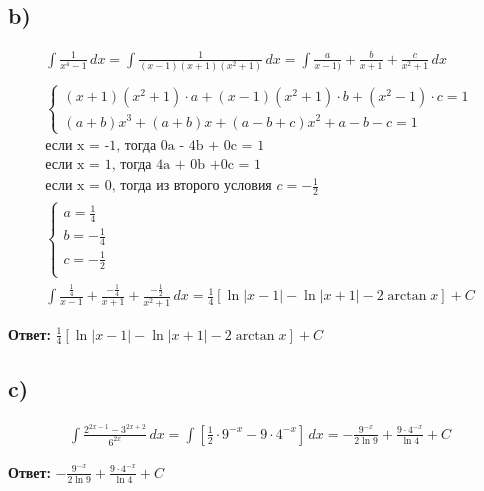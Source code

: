 \documentclass[a4paper,12pt]{article}
\begin{document}
\subsection*{b)}
\begin{equation*}
\begin{gathered}
\int \frac{1}{x^4-1} \,dx = \int \frac{1}{(x-1)(x+1)(x^2+1)} \,dx = \int \frac{a}{x-1)} + \frac{b}{x+1} + \frac{c}{x^2+1} \,dx \\
\\      
\begin{cases}
(x+1)(x^2+1) \cdot a + (x-1)(x^2+1) \cdot b + (x^2-1) \cdot c =  1 \\
(a+b)x^3 + (a+b)x + (a-b+c)x^2 + a  - b - c = 1
\end{cases} \\
\text{если x = -1, тогда 0a - 4b + 0c = 1} \\
\text{если x = 1, тогда 4a  + 0b  +0c = 1} \\
\text{если x = 0, тогда из второго условия } c =-\frac{1}{2}\\
\begin{cases}
a = \frac{1}{4} \\
b = -\frac{1}{4} \\
c = -\frac{1}{2} \\
\end{cases} \\
\int \frac{\frac{1}{4}}{x-1} + \frac{-\frac{1}{4}}{x+1} + \frac{-\frac{1}{2}}{x^2+1}\,dx = \frac{1}{4} \left[\ln |x-1| - \ln |x+1| - 2 \arctan x \right] + C \end{gathered}
\end{equation*}
{\Large \begin{center}
\textbf{Ответ: } $\frac{1}{4} \left[\ln |x-1| - \ln |x+1| - 2 \arctan x \right] + C $
\end{center}}
\subsection*{c)}
\begin{equation*}
\begin{gathered}
\int  \frac{2^{2x-1} - 3^{2x+2}}{6^{2x}} \,dx = \int \left[ \frac{1}{2} \cdot 9^{-x} - 9 \cdot 4^{-x} \right] \,dx = -\frac{9^{-x}}{2 \ln 9} + \frac{9 \cdot 4^{-x}}{\ln 4} + C
\end{gathered}
\end{equation*}
{\Large \begin{center}
\textbf{Ответ: } $-\frac{9^{-x}}{2 \ln 9} + \frac{9 \cdot 4^{-x}}{\ln 4} + C$
\end{center}}
\end{document}
